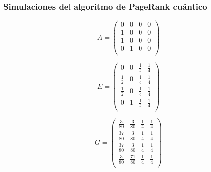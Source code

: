 \documentclass[xetex,mathserif,serif, 8pt]{beamer}
\begin{document}
\begin{frame}
    \frametitle{Simulaciones del algoritmo de PageRank cuántico}

\begin{equation}
    A = 
    \begin{pmatrix}
        0 & 0 & 0 & 0 \\
        1 & 0 & 0 & 0 \\
        1 & 0 & 0 & 0 \\
        0 & 1 & 0 & 0 \\
    \end{pmatrix}
\end{equation}

\begin{equation}
    E =
    \begin{pmatrix}
        0 & 0 & \frac{1}{4} & \frac{1}{4} \\
        \frac{1}{2} & 0 & \frac{1}{4} & \frac{1}{4} \\
        \frac{1}{2} & 0 & \frac{1}{4} & \frac{1}{4} \\
        0 & 1 & \frac{1}{4} & \frac{1}{4} \\
    \end{pmatrix}
\end{equation}

\begin{equation}
    G =
    \begin{pmatrix}
        \frac{3}{80} & \frac{3}{80} & \frac{1}{4} & \frac{1}{4} \\
        \frac{37}{80} & \frac{3}{80} & \frac{1}{4} & \frac{1}{4} \\
        \frac{37}{80} & \frac{3}{80} & \frac{1}{4} & \frac{1}{4} \\
        \frac{3}{80} & \frac{71}{80} & \frac{1}{4} & \frac{1}{4} \\
    \end{pmatrix}
\end{equation}

\end{frame}
\end{document}
